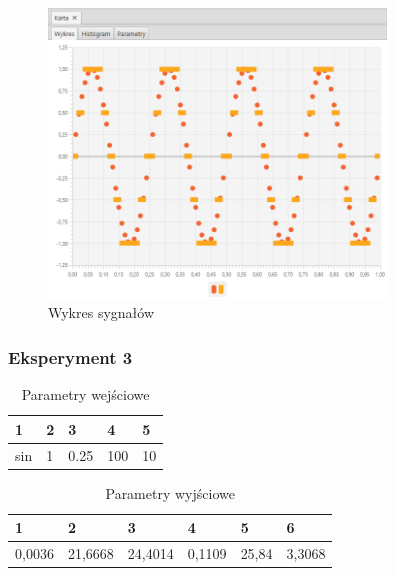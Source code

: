 \documentclass[12pt]{article}
\begin{document}
{{{                \begin{figure}[H]
                    \centering
                    \includegraphics[width=0.8\textwidth]{img/result/experiment5/02/data_draw_sampling_output_quant_output_200417.png}
                    \caption{Wykres sygnałów}
                \end{figure}
            }
            \newpage

            \subsubsection{Eksperyment 3} {
                \begin{table}[H]
                    \centering
                    \begin{tabular}{|l|l|l|l|l|}
                        \hline
                        1 & 2 & 3 & 4 & 5   \\ \hline
                        sin & 1 & 0.25 & 100 & 10    \\ \hline
                    \end{tabular}
                    \caption{Parametry wejściowe}
                \end{table}

                \begin{table}[H]
                    \centering
                    \begin{tabular}{|l|l|l|l|l|l|}
                        \hline
                        1 & 2 & 3 & 4 & 5 & 6  \\ \hline
                        0,0036 & 21,6668 & 24,4014 & 0,1109 & 25,84 & 3,3068 \\ \hline
                    \end{tabular}
                    \caption{Parametry wyjściowe}
                \end{table}


}}}
\end{document}
